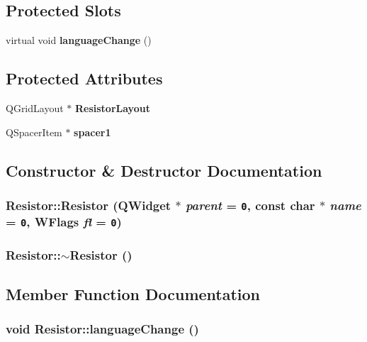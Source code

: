 \subsection*{Protected Slots}
\begin{CompactItemize}
\item 
virtual void {\bf language\-Change} ()
\end{CompactItemize}
\subsection*{Protected Attributes}
\begin{CompactItemize}
\item 
QGrid\-Layout $\ast$ {\bf Resistor\-Layout}
\item 
QSpacer\-Item $\ast$ {\bf spacer1}
\end{CompactItemize}


\subsection{Constructor \& Destructor Documentation}
\subsubsection{\setlength{\rightskip}{0pt plus 5cm}Resistor::Resistor (QWidget $\ast$ {\em parent} = {\tt 0}, const char $\ast$ {\em name} = {\tt 0}, WFlags {\em fl} = {\tt 0})}\label{classResistor_8ad6bc599c1c2a94cab0940f59706688}


\subsubsection{\setlength{\rightskip}{0pt plus 5cm}Resistor::$\sim$Resistor ()}\label{classResistor_3230942344edf5a000a0cd5ac73ba702}




\subsection{Member Function Documentation}
\subsubsection{\setlength{\rightskip}{0pt plus 5cm}void Resistor::language\-Change ()\hspace{0.3cm}{\tt  [protected, virtual, slot]}}\label{classResistor_1182bf5637039731d24c9b1e622b4179}




